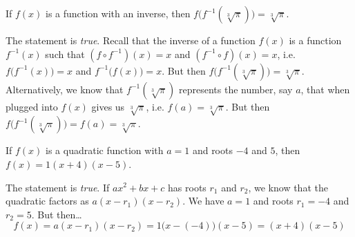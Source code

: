 \documentclass[11pt,letterpaper]{article}
\begin{document}
 If $f(x)$ is a function with an inverse, then $f \big( f^{-1}( \sqrt[3]{\pi} ) \big)= \sqrt[3]{\pi}$. \pspace

\sol The statement is \textit{true}. Recall that the inverse of a function $f(x)$ is a function $f^{-1}(x)$ such that $(f \circ f^{-1})(x)= x$ and $(f^{-1} \circ f)(x)= x$, i.e. $f \big( f^{-1}(x) \big)= x$ and $f^{-1} \big( f(x) \big)= x$. But then $f \big( f^{-1}( \sqrt[3]{\pi} ) \big)= \sqrt[3]{\pi}$. Alternatively, we know that $f^{-1}( \sqrt[3]{\pi} )$ represents the number, say $a$, that when plugged into $f(x)$ gives us $\sqrt[3]{\pi}$, i.e. $f(a)= \sqrt[3]{\pi}$. But then $f \big( f^{-1}( \sqrt[3]{\pi} ) \big)= f(a)= \sqrt[3]{\pi}$. \pvspace{1.3cm}



 If $f(x)$ is a quadratic function with $a= 1$ and roots $-4$ and $5$, then $f(x)= 1(x + 4)(x - 5)$. \pspace

\sol The statement is \textit{true}. If $ax^2 + bx + c$ has roots $r_1$ and $r_2$, we know that the quadratic factors as $a(x - r_1)(x - r_2)$. We have $a= 1$ and roots $r_1= -4$ and $r_2= 5$. But then\dots
	\[
	f(x)= a(x - r_1)(x - r_2)= 1 \big(x - (-4) \big)(x - 5)= (x + 4)(x - 5)
	\] \pvspace{1.3cm}
\end{document}
